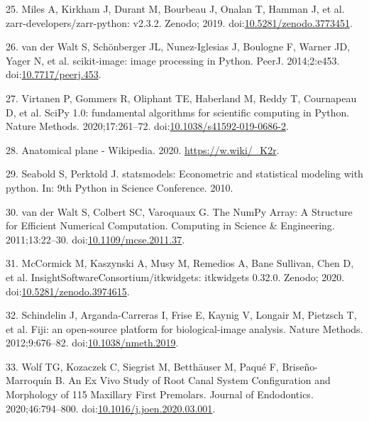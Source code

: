 \documentclass[
  american,
]{article}
\newenvironment{cslreferences}%
  {}%
  {\par}
\begin{document}
\begin{cslreferences}
\leavevmode\hypertarget{ref-10Fk3ASPz}{}%
25. Miles A, Kirkham J, Durant M, Bourbeau J, Onalan T, Hamman J, et al. zarr-developers/zarr-python: v2.3.2. Zenodo; 2019. doi:\href{https://doi.org/10.5281/zenodo.3773451}{10.5281/zenodo.3773451}.

\leavevmode\hypertarget{ref-stvWEJeu}{}%
26. van der Walt S, Schönberger JL, Nunez-Iglesias J, Boulogne F, Warner JD, Yager N, et al. scikit-image: image processing in Python. PeerJ. 2014;2:e453. doi:\href{https://doi.org/10.7717/peerj.453}{10.7717/peerj.453}.

\leavevmode\hypertarget{ref-8Miti2Gz}{}%
27. Virtanen P, Gommers R, Oliphant TE, Haberland M, Reddy T, Cournapeau D, et al. SciPy 1.0: fundamental algorithms for scientific computing in Python. Nature Methods. 2020;17:261--72. doi:\href{https://doi.org/10.1038/s41592-019-0686-2}{10.1038/s41592-019-0686-2}.

\leavevmode\hypertarget{ref-ydSnvH5h}{}%
28. Anatomical plane - Wikipedia. 2020. \url{https://w.wiki/_K2r}.

\leavevmode\hypertarget{ref-E4OYV0qi}{}%
29. Seabold S, Perktold J. statsmodels: Econometric and statistical modeling with python. In: 9th Python in Science Conference. 2010.

\leavevmode\hypertarget{ref-OiM2HfsY}{}%
30. van der Walt S, Colbert SC, Varoquaux G. The NumPy Array: A Structure for Efficient Numerical Computation. Computing in Science \& Engineering. 2011;13:22--30. doi:\href{https://doi.org/10.1109/mcse.2011.37}{10.1109/mcse.2011.37}.

\leavevmode\hypertarget{ref-v85zR2Z2}{}%
31. McCormick M, Kaszynski A, Musy M, Remedios A, Bane Sullivan, Chen D, et al. InsightSoftwareConsortium/itkwidgets: itkwidgets 0.32.0. Zenodo; 2020. doi:\href{https://doi.org/10.5281/zenodo.3974615}{10.5281/zenodo.3974615}.

\leavevmode\hypertarget{ref-Fkmz2cmo}{}%
32. Schindelin J, Arganda-Carreras I, Frise E, Kaynig V, Longair M, Pietzsch T, et al. Fiji: an open-source platform for biological-image analysis. Nature Methods. 2012;9:676--82. doi:\href{https://doi.org/10.1038/nmeth.2019}{10.1038/nmeth.2019}.

\leavevmode\hypertarget{ref-jsWNcnau}{}%
33. Wolf TG, Kozaczek C, Siegrist M, Betthäuser M, Paqué F, Briseño-Marroquín B. An Ex Vivo Study of Root Canal System Configuration and Morphology of 115 Maxillary First Premolars. Journal of Endodontics. 2020;46:794--800. doi:\href{https://doi.org/10.1016/j.joen.2020.03.001}{10.1016/j.joen.2020.03.001}.


\end{cslreferences}
\end{document}
